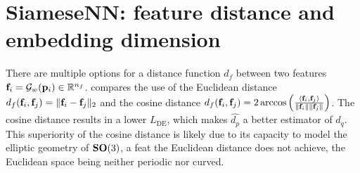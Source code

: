 \section{SiameseNN: feature distance and embedding dimension}\label{apx:siamese:feature-distance-and-embedding-dimension}


There are multiple options for a distance function $d_f$ between two features $\mathbf{f}_i = \mathcal{G}_w(\mathbf{p}_i) \in \mathbb{R}^{n_f}$.
 compares the use of the Euclidean distance $d_f(\mathbf{f}_i, \mathbf{f}_j) = \Vert \mathbf{f}_i - \mathbf{f}_j \Vert_2$ and the cosine distance $d_f(\mathbf{f}_i, \mathbf{f}_j) = 2 \arccos \left( \frac{\langle \mathbf{f}_i, \mathbf{f}_j \rangle}{\lVert \mathbf{f}_i \rVert \lVert \mathbf{f}_j \rVert} \right)$. The cosine distance results in a lower $L_\text{DE}$, which makes $\widehat{d_p}$ a better estimator of $d_q$.
This superiority of the cosine distance is likely due to its capacity to model the elliptic geometry of $\mathrm{\mathbf{SO}}(3)$, a feat the Euclidean distance does not achieve, the Euclidean space being neither periodic nor curved.


